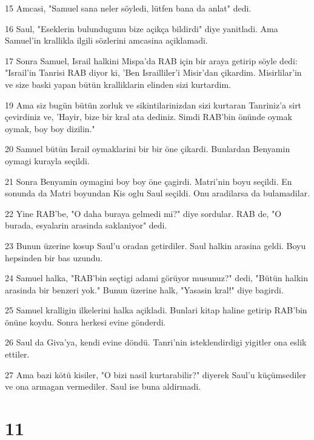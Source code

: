 \par 15 Amcasi, "Samuel sana neler söyledi, lütfen bana da anlat" dedi.
\par 16 Saul, "Eseklerin bulundugunu bize açikça bildirdi" diye yanitladi. Ama Samuel'in krallikla ilgili sözlerini amcasina açiklamadi.
\par 17 Sonra Samuel, Israil halkini Mispa'da RAB için bir araya getirip söyle dedi: "Israil'in Tanrisi RAB diyor ki, 'Ben Israilliler'i Misir'dan çikardim. Misirlilar'in ve size baski yapan bütün kralliklarin elinden sizi kurtardim.
\par 19 Ama siz bugün bütün zorluk ve sikintilarinizdan sizi kurtaran Tanriniz'a sirt çevirdiniz ve, 'Hayir, bize bir kral ata dediniz. Simdi RAB'bin önünde oymak oymak, boy boy dizilin."
\par 20 Samuel bütün Israil oymaklarini bir bir öne çikardi. Bunlardan Benyamin oymagi kurayla seçildi.
\par 21 Sonra Benyamin oymagini boy boy öne çagirdi. Matri'nin boyu seçildi. En sonunda da Matri boyundan Kis oglu Saul seçildi. Onu aradilarsa da bulamadilar.
\par 22 Yine RAB'be, "O daha buraya gelmedi mi?" diye sordular. RAB de, "O burada, esyalarin arasinda saklaniyor" dedi.
\par 23 Bunun üzerine kosup Saul'u oradan getirdiler. Saul halkin arasina geldi. Boyu hepsinden bir bas uzundu.
\par 24 Samuel halka, "RAB'bin seçtigi adami görüyor musunuz?" dedi, "Bütün halkin arasinda bir benzeri yok." Bunun üzerine halk, "Yasasin kral!" diye bagirdi.
\par 25 Samuel kralligin ilkelerini halka açikladi. Bunlari kitap haline getirip RAB'bin önüne koydu. Sonra herkesi evine gönderdi.
\par 26 Saul da Giva'ya, kendi evine döndü. Tanri'nin isteklendirdigi yigitler ona eslik ettiler.
\par 27 Ama bazi kötü kisiler, "O bizi nasil kurtarabilir?" diyerek Saul'u küçümsediler ve ona armagan vermediler. Saul ise buna aldirmadi.

\chapter{11}

